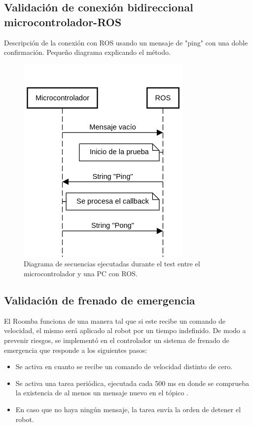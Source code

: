 \subsection{Validación de conexión bidireccional microcontrolador-ROS}

Descripción de la conexión con ROS usando un mensaje de "ping" con una doble confirmación. Pequeño diagrama explicando el método.

\begin{figure}[ht]
    \centering
    \includegraphics[scale=0.6]{./Figures/comm_test1.png}
    \caption{Diagrama de secuencias ejecutadas durante el test entre el microcontrolador y una PC con ROS.}
    \label{fig:rviz}
\end{figure}

\subsection{Validación de frenado de emergencia}

El Roomba funciona de una manera tal que si este recibe un comando de velocidad, el mismo será aplicado al robot por un tiempo indefinido. De modo a prevenir riesgos, se implementó en el controlador un sistema de frenado de emergencia que responde a los siguientes pasos:

\begin{itemize}
    \item Se activa en cuanto se recibe un comando de velocidad distinto de cero.
    \item Se activa una tarea periódica, ejecutada cada 500 ms en donde se comprueba la existencia de al menos un mensaje nuevo en el tópico .
    \item En caso que no haya ningún mensaje, la tarea envía la orden de detener el robot.
\end{itemize}

